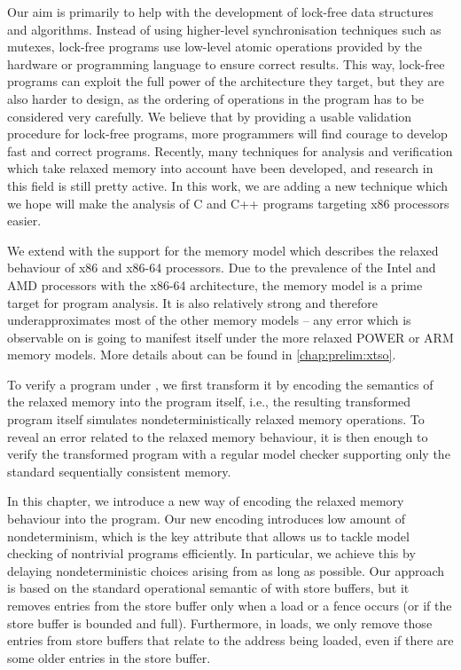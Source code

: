 Our aim is primarily to help with the development of lock-free data structures and algorithms.
Instead of using higher-level synchronisation techniques such as mutexes, lock-free programs use low-level atomic operations provided by the hardware or programming language to ensure correct results.
This way, lock-free programs can exploit the full power of the architecture they target, but they are also harder to design, as the ordering of operations in the program has to be considered very carefully.
We believe that by providing a usable validation procedure for lock-free
programs, more programmers will find courage to develop fast and correct programs.
Recently, many techniques for analysis and verification which take relaxed memory into account have been developed, and research in this field is still pretty active.
In this work, we are adding a new technique which we hope will make the analysis of C and C++ programs targeting x86 processors easier.

We extend \divine with the support for the \xtso memory model 
which describes the relaxed behaviour of x86 and x86-64 processors.
Due to the prevalence of the Intel and AMD processors with the x86-64
architecture, the \xtso memory model is a prime target for program analysis.
It is also relatively strong and therefore underapproximates most of the other
memory models -- any error which is observable on \xtso is going to manifest
itself under the more relaxed POWER or ARM memory models.
More details about \xtso can be found in \autoref{chap:prelim:xtso}.

To verify a program under \xtso, we first transform it by encoding the
semantics of the relaxed memory into the program itself, i.e., the resulting
transformed program itself simulates nondeterministically relaxed memory
operations.
To reveal an error related to the relaxed memory behaviour, it is then enough to
verify the transformed program with a regular model checker supporting only the
standard sequentially consistent memory.

In this chapter, we introduce a new way of encoding the relaxed memory behaviour
into the program.
Our new encoding introduces low amount of nondeterminism, which is the key
attribute that allows us to tackle model checking of nontrivial programs
efficiently.
In particular, we achieve this by delaying nondeterministic choices arising
from \xtso as long as possible.
Our approach is based on the standard operational semantic of \xtso with store
buffers, but it removes entries from the store buffer only when a load or a
fence occurs (or if the store buffer is bounded and full).
Furthermore, in loads, we only remove those entries from store buffers that
relate to the address being loaded, even if there are some older entries in the
store buffer.

